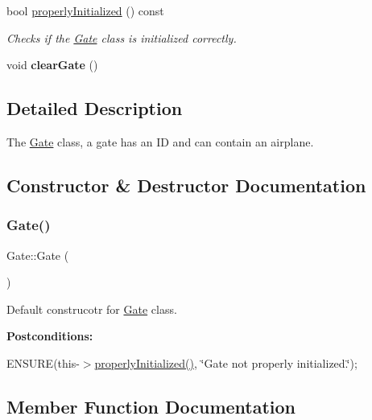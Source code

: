 \begin{DoxyCompactItemize}
bool \mbox{\hyperlink{class_gate_a51a6794e1e26f03c75f469a6ee8d3432}{properly\+Initialized}} () const
\begin{DoxyCompactList}\small\item\em Checks if the \mbox{\hyperlink{class_gate}{Gate}} class is initialized correctly. \end{DoxyCompactList}\item 
\mbox{\label{class_gate_a655a2eabe79fccb8d42805060f7b48b1}} 
void {\bfseries clear\+Gate} ()
\end{DoxyCompactItemize}


\subsection{Detailed Description}
The \mbox{\hyperlink{class_gate}{Gate}} class, a gate has an ID and can contain an airplane. 

\subsection{Constructor \& Destructor Documentation}
\mbox{\label{class_gate_a4fc24ecebc0ca8252bf7ab96a705e58a}} 
\subsubsection{\texorpdfstring{Gate()}{Gate()}}
{\footnotesize\ttfamily Gate\+::\+Gate (\begin{DoxyParamCaption}{ }\end{DoxyParamCaption})}



Default construcotr for \mbox{\hyperlink{class_gate}{Gate}} class. 

{\bfseries Postconditions\+:}
\begin{DoxyItemize}
\item E\+N\+S\+U\+RE(this-\/$>$\mbox{\hyperlink{class_gate_a51a6794e1e26f03c75f469a6ee8d3432}{properly\+Initialized()}}, \char`\"{}\+Gate not properly initialized.\char`\"{}); 
\end{DoxyItemize}

\subsection{Member Function Documentation}
\mbox{\label{class_gate_a9ba3d9aa4f60f5b97a1fb391b7490938}} 
